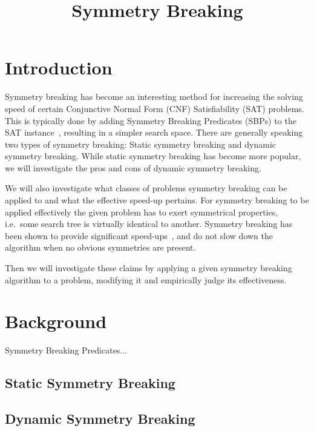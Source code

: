

\title{Symmetry Breaking}


	\maketitle
	
	\listoftodos

	\begin{abstract}
	\end{abstract}
	
	\section{Introduction} \label{sec:Introduction}
		Symmetry breaking has become an interesting method for increasing the solving speed of certain Conjunctive Normal Form (CNF) Satisfiability (SAT) problems.
		This is typically done by adding Symmetry Breaking Predicates (SBPs) to the SAT instance~\cite{sakallah2009symmetry},
		resulting in a simpler search space.
		There are generally speaking two types of symmetry breaking: Static symmetry breaking and dynamic symmetry breaking.
		While static symmetry breaking has become more popular, we will investigate the pros and cons of dynamic symmetry breaking.
		
		We will also investigate what classes of problems symmetry breaking can be applied to and what the effective speed-up pertains.
		For symmetry breaking to be applied effectively the given problem has to exert symmetrical properties,
		i.e.\ some search tree is virtually identical to another.
		Symmetry breaking has been shown to provide significant speed-ups~\cite{darga2004exploiting,aloul2003solving},
		and do not slow down the algorithm when no obvious symmetries are present.
		
		Then we will investigate these claims by applying a given symmetry breaking algorithm to a problem, modifying it and empirically judge its effectiveness. 
		
	\section{Background} \label{sec:Background}
		Symmetry Breaking Predicates...
		
		\subsection{Static Symmetry Breaking}
			
		\subsection{Dynamic Symmetry Breaking}
		

	\nocite{*} %
	
	

